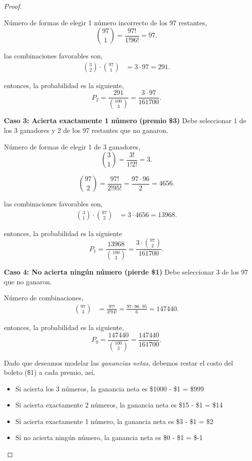 \documentclass{article}
\begin{document}
\begin{proof}
\begin{itemize}
Número de formas de elegir 1 número incorrecto de los 97 restantes,
\[
\binom{97}{1} = \frac{97!}{1!96!} = 97.
\]

las combinaciones favorables son,
\begin{align*}
\binom{3}{2} \cdot \binom{97}{1} &= 3 \cdot 97 = 291.
\end{align*}

entonces, la probabilidad es la siguiente,
\begin{equation}
 \label{2}
  P_2 = \frac{291}{\binom{100}{3}} = \frac{3 \cdot 97}{161700}.
\end{equation}

{\textbf{Caso 3: Acierta exactamente 1 número (premio \$3)}}
Debe seleccionar 1 de los 3 ganadores y 2 de los 97 restantes que no ganaron.

Número de formas de elegir 1 de 3 ganadores,
\[
\binom{3}{1} = \frac{3!}{1!2!} = 3.
\]

\[
\binom{97}{2} = \frac{97!}{2!95!} = \frac{97 \cdot 96}{2} = 4656.
\]

las combinaciones favorables son,
\begin{align*}
\binom{3}{1} \cdot \binom{97}{2} &= 3 \cdot 4656 = 13968.
\end{align*}

entonces, la probabilidad es la siguiente
\begin{equation}
 \label{3}
 P_1 = \frac{13968}{\binom{100}{3}} = \frac{3 \cdot \binom{97}{2}}{161700}.   
\end{equation}


{\textbf{Caso 4: No acierta ningún número (pierde \$1)}}
Debe seleccionar 3 de los 97 que no ganaron.

Número de combinaciones,
\begin{align*}
\binom{97}{3} &= \frac{97!}{3!94!} = \frac{97 \cdot 96 \cdot 95}{6} = 147440.
\end{align*}

entonces, la probabilidad es la siguiente,
\begin{equation}
 \label{4}
  P_0 = \frac{147440}{\binom{100}{3}} = \frac{147440}{161700}.
\end{equation}



Dado que deseamos modelar las \textit{ganancias netas}, debemos restar el costo del boleto (\$1) a cada premio, así,
\begin{itemize}
    \item Si acierta los 3 números, la ganancia neta es \$1000 - \$1 = \$999
    \item Si acierta exactamente 2 números, la ganancia neta es \$15 - \$1 = \$14
    \item Si acierta exactamente 1 número, la ganancia neta es \$3 - \$1 = \$2
    \item Si no acierta ningún número, la ganancia neta es \$0 - \$1 = \$-1
\end{itemize}


\end{itemize}
\end{proof}
\end{document}
